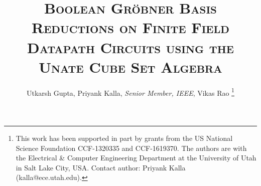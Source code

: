 \documentclass[10pt,twocolumn]{IEEEtran}
\newcommand{\ls}[1]
    {\dimen0=\fontdimen6\the\font
     \lineskip=#1\dimen0
     \advance\lineskip.5\fontdimen5\the\font
     \advance\lineskip-\dimen0
     \lineskiplimit=.9\lineskip
     \baselineskip=\lineskip
     \advance\baselineskip\dimen0
     \normallineskip\lineskip
     \normallineskiplimit\lineskiplimit
     \normalbaselineskip\baselineskip
     \ignorespaces
    }
\begin{document}



\title{\Large\textsc{Boolean Gr\"obner Basis Reductions on Finite Field Datapath Circuits using the Unate Cube Set Algebra}}
\author{Utkarsh Gupta, Priyank Kalla, {\it Senior Member, IEEE}, Vikas Rao 
\thanks{This work has been supported in part by grants from the US
  National Science Foundation CCF-1320335 and CCF-1619370. The authors
are with the Electrical \& Computer Engineering Department at the
University of Utah in Salt Lake City, USA. Contact author: Priyank
Kalla (kalla@ece.utah.edu).  }
}
 
 
\maketitle
\thispagestyle{empty}

\newcommand{\Fq}{{\mathbb{F}}_{q}}
\newcommand{\Fkk}{{\mathbb{F}}_{2^k}}
\newcommand{\Zkk}{{\mathbb{Z}}_{2^k}}
\newcommand{\Ftwo}{{\mathbb{F}}_{2}}
\newcommand{\Fkkx}[1][x]{\ensuremath{\mathbb{F}}_{2^k}[#1]\xspace}
\newcommand{\Grobner}{Gr\"{o}bner\xspace}
\newcommand{\B}{{\mathbb{B}}}
\newcommand{\Z}{{\mathbb{Z}}}
\newcommand{\F}{{\mathbb{F}}}
\newcommand{\G}{{\mathcal{G}}}
\newcommand{\alert}[1]{\textcolor{red}{#1}}

\newcommand{\spec}{{\it Spec}\xspace\ \xspace}

\newcommand{\debug}[1]{\textcolor{red}{[ #1 ]}}









\end{document}
